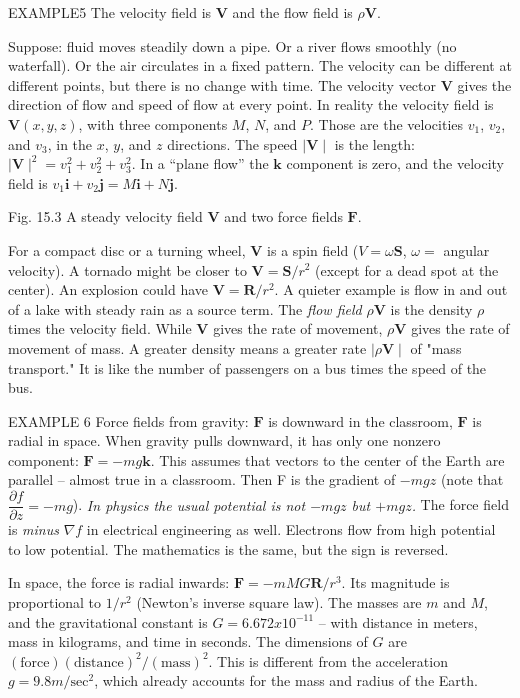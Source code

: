 EXAMPLE5 The velocity field is $\mathbf{V}$ and the flow field is $\rho \mathbf{V}$.

Suppose: fluid moves steadily down a pipe. Or a river flows smoothly (no waterfall).
Or the air circulates in a fixed pattern. The velocity can be different at different points,
but there is no change with time. The velocity vector $\mathbf{V}$ gives the direction of flow
and speed of flow at every point.
In reality the velocity field is $\mathbf{V}(x, y, z)$, with three components $M$, $N$, and $P$. Those are
the velocities $v_1$, $v_2$, and $v_3$, in the $x$, $y$, and $z$ directions. The speed $\mid \mathbf{V} \mid$ is the length: 
$\mid\mathbf{V}\mid^2 = v_1^2 + v_2^2 +v_3^2$. In a ``plane flow'' the $\mathbf{k}$ component is zero, and the velocity field is
$v_1\mathbf{i}+v_2\mathbf{j}= M\mathbf{i}+ N\mathbf{j}$.

Fig. 15.3 A steady velocity field $\mathbf{V}$ and two force fields $\mathbf{F}$. 

For a compact disc or a turning wheel, $\mathbf{V}$ is a spin field ($V =\omega \mathbf{S}$, $\omega=$ angular
velocity). A tornado might be closer to $\mathbf{V} =\mathbf{S}/r^2$ (except for a dead spot at the center).
An explosion could have $\mathbf{V} =\mathbf{R}/r^2$. A quieter example is flow in and out of a lake
with steady rain as a source term.
The \emph{flow field} $\rho \mathbf{V}$ is the density $\rho$ times the velocity field. While $\mathbf{V}$ gives the rate of
movement, $\rho \mathbf{V}$ gives the rate of movement of mass. A greater density means a greater
rate $\mid \rho \mathbf{V} \mid$ of "mass transport." It is like the number of passengers on a bus times the
speed of the bus.

EXAMPLE 6 Force fields from gravity: $\mathbf{F}$ is downward in the classroom, $\mathbf{F}$ is radial
in space.
When gravity pulls downward, it has only one nonzero component: $\mathbf{F} = -mg\mathbf{k}$. This
assumes that vectors to the center of the Earth are parallel -- almost true in a classroom.
Then F is the gradient of $-mgz$ (note that $\dfrac{\partial f}{\partial z} = -mg$).
\emph{In physics the usual potential is not $-mgz$ but $+mgz$.} The force field is \emph{minus} $\nabla f$
in electrical engineering as well. Electrons flow from high potential to low potential.
The mathematics is the same, but the sign is reversed.

In space, the force is radial inwards: $\mathbf{F} = -mMG\mathbf{R}/r^3$. Its magnitude is proportional
to $1/r^2$ (Newton's inverse square law). The masses are $m$ and $M$, and the
gravitational constant is $G =6.672 x 10^{-11}$ -- with distance in meters, mass in kilograms,
and time in seconds. The dimensions of $G$ are $(\text{force})(\text{distance})^2/(\text{mass})^2$. This
is different from the acceleration $g =9.8m/\text{sec}^2$, which already accounts for the mass
and radius of the Earth.

